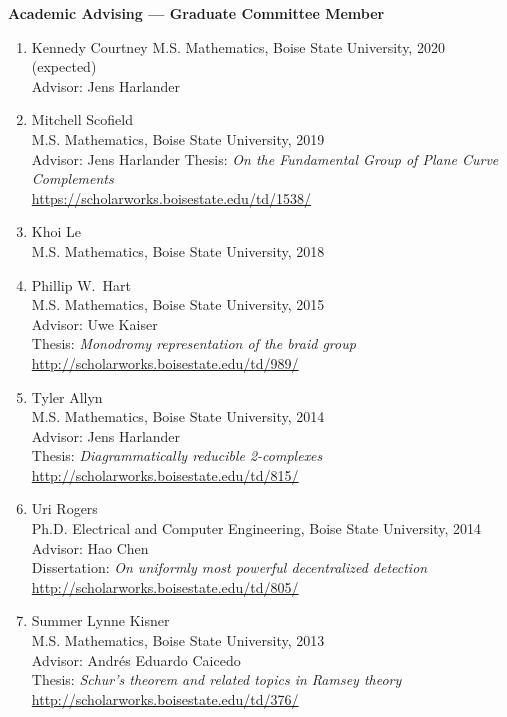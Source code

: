 \documentclass[12pt]{article}
\begin{document}
\textbf{Academic Advising --- Graduate Committee Member}
\begin{enumerate}

\item Kennedy Courtney
M.S. Mathematics, Boise State University, 2020 (expected) \\
Advisor: Jens Harlander

\item Mitchell Scofield \\
M.S. Mathematics, Boise State University, 2019 \\
Advisor: Jens Harlander
Thesis: \emph{On the Fundamental Group of Plane Curve Complements} \\
\url{https://scholarworks.boisestate.edu/td/1538/}

\item Khoi Le \\
M.S. Mathematics, Boise State University, 2018 \\

\item Phillip W.\ Hart \\
M.S. Mathematics, Boise State University, 2015 \\
Advisor: Uwe Kaiser \\
Thesis: \emph{Monodromy representation of the braid group} \\
\url{http://scholarworks.boisestate.edu/td/989/}

\item Tyler Allyn \\
M.S. Mathematics, Boise State University, 2014 \\
Advisor: Jens Harlander \\
Thesis: \emph{Diagrammatically reducible 2-complexes} \\
\url{http://scholarworks.boisestate.edu/td/815/}

\item Uri Rogers \\
Ph.D. Electrical and Computer Engineering, Boise State University, 2014 \\
Advisor: Hao Chen \\
Dissertation: \emph{On uniformly most powerful decentralized detection} \\
\url{http://scholarworks.boisestate.edu/td/805/}

\item Summer Lynne Kisner \\
M.S. Mathematics, Boise State University, 2013 \\
Advisor: Andr\'es Eduardo Caicedo \\
Thesis: \emph{Schur's theorem and related topics in Ramsey theory} \\
\url{http://scholarworks.boisestate.edu/td/376/}


\end{enumerate}
\end{document}
